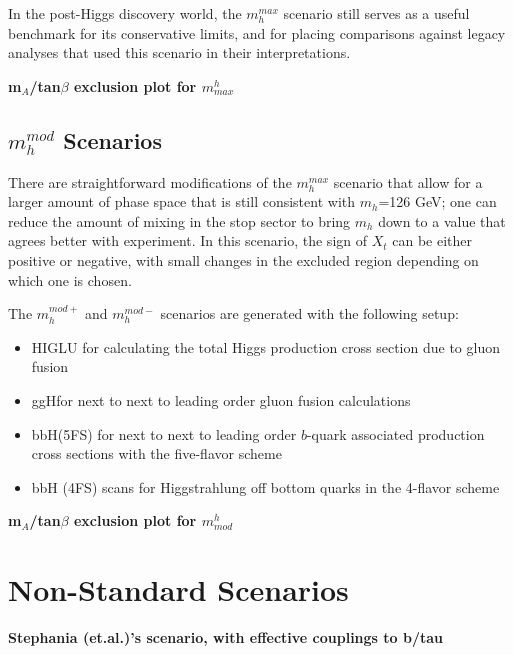 In the post-Higgs discovery world, the $m_h^{max}$ scenario still serves as a useful
benchmark for its conservative limits, and for placing comparisons against legacy analyses
that used this scenario in their interpretations.   

\textbf{m$_A$/tan$\beta$ exclusion plot for $m^h_{max}$}


\subsection{$m_h^{mod}$ Scenarios}
There are straightforward modifications of the $m_h^{max}$ scenario that allow for 
a larger amount of phase space that is still consistent with $m_h$=126 GeV; one
can reduce the amount of mixing in the stop sector to bring $m_h$ down to a value
that agrees better with experiment.  In this scenario, the sign of $X_t$ can be either
positive or negative, with small changes in the excluded region depending on 
which one is chosen.

The $m_h^{mod+}$ and $m_h^{mod-}$ scenarios are generated with the following setup:
\begin{itemize}
    \item HIGLU for calculating the total Higgs production cross section due to gluon fusion \cite{higlu}
    \item ggH\@NNLO for next to next to leading order gluon fusion calculations \cite{gghnnlo} 
    \item bbH\@NNLO (5FS) for next to next to leading order $b$-quark associated production cross sections with the five-flavor scheme \cite{bbhnnlo}
    \item bbH (4FS) scans for Higgstrahlung off bottom quarks in the 4-flavor scheme \cite{bbh_4fs_1} \cite{bbh_4fs_2}
\end{itemize}

\textbf{m$_A$/tan$\beta$ exclusion plot for $m^h_{mod}$}




\section{Non-Standard Scenarios}
\label{sec:interp_new_benchmark} 
\textbf{Stephania (et.al.)'s scenario, with effective couplings to b/tau}



